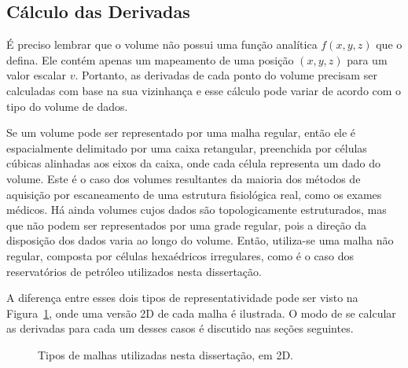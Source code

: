 \subsection{Cálculo das Derivadas}
	É preciso lembrar que o volume não possui uma função analítica $ f(x, y, z) $ que o defina. Ele contém apenas um mapeamento de uma posição $ (x, y, z) $ para um valor escalar $ v $. Portanto, as derivadas de cada ponto do volume precisam ser calculadas com base na sua vizinhança e esse cálculo pode variar de acordo com o tipo do volume de dados.
	
	Se um volume pode ser representado por uma malha regular, então ele é espacialmente delimitado por uma caixa retangular, preenchida por células cúbicas alinhadas aos eixos da caixa, onde cada célula representa um dado do volume. Este é o caso dos volumes resultantes da maioria dos métodos de aquisição por escaneamento de uma estrutura fisiológica real, como os exames médicos. Há ainda volumes cujos dados são topologicamente estruturados, mas que não podem ser representados por uma grade regular, pois a direção da disposição dos dados varia ao longo do volume. Então, utiliza-se uma malha não regular, composta por células hexaédricos irregulares, como é o caso dos reservatórios de petróleo utilizados nesta dissertação.
	
	A diferença entre esses dois tipos de representatividade pode ser visto na Figura~\ref{fig:meshes}, onde uma versão 2D de cada malha é ilustrada. O modo de se calcular as derivadas para cada um desses casos é discutido nas seções seguintes.
	
\begin{figure}[h]
	\centering
	\hspace{10mm}
	\caption{Tipos de malhas utilizadas nesta dissertação, em 2D.}
	\label{fig:meshes}
\end{figure}
    
